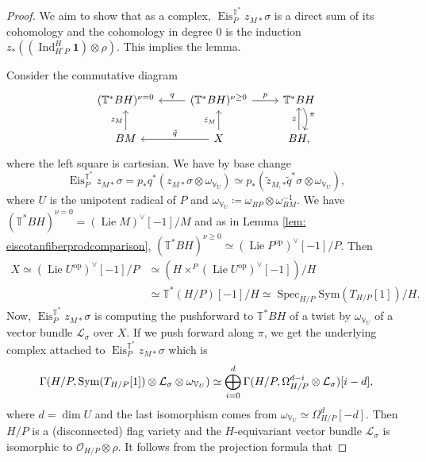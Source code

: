 \documentclass{amsart}
\theoremstyle{definition}
\theoremstyle{remark}
\numberwithin{equation}{section}
\DeclareMathOperator{\Lie}{Lie}
\DeclareMathOperator{\Spec}{Spec}
\DeclareMathOperator{\Ind}{Ind}
\newcommand{\mc}{\mathcal}
\newcommand{\op}{\mathrm{op}}
\newcommand{\Sym}{\mathrm{Sym}}
\DeclareMathOperator{\Eis}{\mathrm{Eis}}
\newcommand{\V}{\mathbb{V}}
\newcommand{\T}{\mathbb{T}}
\begin{document}
\begin{proof}
We aim to show that as a complex, $\Eis^{\T^{\ast}}_P z_{M \ast} \sigma$ is a direct sum of its cohomology and the cohomology in degree $0$ is the induction $z_{\ast}((\Ind^{H}_{H^\circ P}\mathbf{1})\otimes \rho)$. This implies the lemma.

Consider the commutative diagram
\begin{equation*}
    \begin{tikzcd}
        (\T^{\ast}BH)^{\nu = 0} &  (\T^{\ast}BH)^{\nu \geq 0} \arrow[l, swap, "q"] \arrow[r, "p"] & \T^{\ast}BH \arrow[d, bend left=30, "\pi"] \\
        BM \arrow[u, "z_M"] & X \arrow[u, "\tilde{z}_M"] \arrow[l, swap, "\tilde{q}"] & BH \arrow[u, "z"],
    \end{tikzcd}
\end{equation*}
where the left square is cartesian. We have by base change
\begin{equation*}
    \Eis^{\T^{\ast}}_P z_{M \ast} \sigma = p_{\ast}q^{\ast} (z_{M \ast} \sigma \otimes \omega_{\V_U}) \simeq p_{\ast}(\tilde{z}_{M, \ast}\tilde{q}^{\ast} \sigma \otimes \omega_{\V_U}),
\end{equation*}
where $U$ is the unipotent radical of $P$ and $\omega_{\V_U}\coloneq\omega_{BP}\otimes \omega_{BM}^{-1}$. We have $(\T^{\ast}BH)^{\nu = 0} = (\Lie M)^{\vee}[-1] / M$ and as in Lemma \ref{lem: eiscotanfiberprodcomparison},
$(\T^{\ast}BH)^{\nu \geq 0} \simeq (\Lie P^{\op})^{\vee}[-1] / P$. Then 
\begin{align*}
  X \simeq (\Lie U^{\op})^\vee[-1] /P  & \simeq  (H \times^P (\Lie U^{\op})^\vee[-1]) /H\\
  & \simeq \T^{\ast}(H/P)[-1] / H \simeq \Spec_{H/P}\Sym(T_{H/P}[1]) / H. 
\end{align*}
Now, $\Eis^{\T^{\ast}}_P z_{M \ast} \sigma$ is computing the pushforward to $\T^{\ast}BH$ of a twist by $\omega_{\V_U}$ of a vector bundle $\mc{L}_{\sigma}$ over $X$. If we push forward along $\pi$, we get the underlying complex attached to $\Eis^{\T^{\ast}}_P z_{M \ast} \sigma$ which is
\begin{equation}{\label{eqn: underlyingrepcohomologyformula}}
    \Gamma(H/P, \Sym(T_{H/P}[1]) \otimes \mc{L}_{\sigma} \otimes \omega_{\V_U}) \simeq \bigoplus\limits_{i=0}^d \Gamma(H/P, \Omega^{d-i}_{H/P} \otimes \mc{L}_{\sigma})[i-d],
\end{equation}
where $d = \dim U$ and the last isomorphism comes from $\omega_{\V_U} \simeq \Omega^d_{H/P}[-d]$. Then $H/P$ is a (disconnected) flag variety and the $H$-equivariant vector bundle $\mc{L}_{\sigma}$ is isomorphic to $\mc{O}_{H/P} \otimes \rho$. It follows from the projection formula that

\end{proof}
\end{document}
